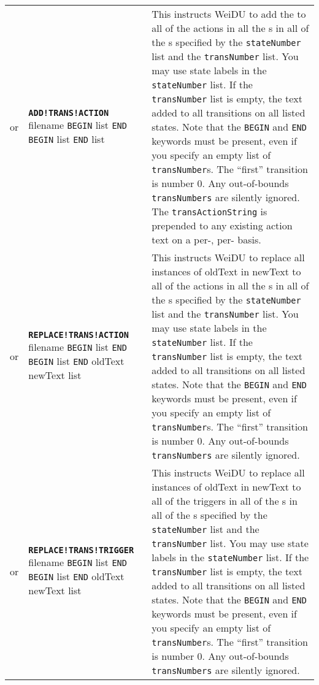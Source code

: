 \documentclass{article}
\def\ttref#1{\ahrefloc{#1}{\tt #1}}
\def\DEFINE#1{{\tt \bf #1}\label{#1}\index{#1}}
\def\t#1{{\tt #1}}
\def\Slist{{\color{red} list }}
\begin{document}
\begin{tabular}{cp{10in}|p{10in}}
  or & \DEFINE{ADD!TRANS!ACTION} filename 
    \t{BEGIN} \ttref{stateNumber} \Slist \t{END} 
    \t{BEGIN} \ttref{transNumber} \Slist \t{END}
    \ttref{transActionString} \ttref{dActionWhen} \Slist &
  This instructs WeiDU to add the \ttref{transActionString} to all
  of the actions in all the \ttref{transition}s in all of the \ttref{state}s specified by the
  \t{stateNumber} list and the \t{transNumber} list. You may use
  state labels in the \t{stateNumber} list. If the \t{transNumber} list
  is empty, the text added to all transitions on all listed states.
  Note that the \t{BEGIN} and \t{END} keywords must be present, even if you
  specify an empty list of \t{transNumber}s.
  The ``first'' transition is number 0. Any out-of-bounds \t{transNumbers}
  are silently ignored. The \t{transActionString} is prepended to any
  existing action text on a per-\ttref{transition}, per-\ttref{state}
  basis.

  \\

  or & \DEFINE{REPLACE!TRANS!ACTION} filename
    \t{BEGIN} \ttref{stateNumber} \Slist \t{END}
    \t{BEGIN} \ttref{transNumber} \Slist \t{END}
    oldText newText \ttref{dActionWhen} \Slist &
  This instructs WeiDU to replace all instances of oldText in newText to all
  of the actions in all the \ttref{transition}s in all of the \ttref{state}s specified by the
  \t{stateNumber} list and the \t{transNumber} list. You may use
  state labels in the \t{stateNumber} list. If the \t{transNumber} list
  is empty, the text added to all transitions on all listed states.
  Note that the \t{BEGIN} and \t{END} keywords must be present, even if you
  specify an empty list of \t{transNumber}s.
  The ``first'' transition is number 0. Any out-of-bounds \t{transNumbers}
  are silently ignored.

  \\
  or & \DEFINE{REPLACE!TRANS!TRIGGER} filename
    \t{BEGIN} \ttref{stateNumber} \Slist \t{END}
    \t{BEGIN} \ttref{transNumber} \Slist \t{END}
    oldText newText \ttref{dActionWhen} \Slist &
  This instructs WeiDU to replace all instances of oldText in newText to all
  of the triggers in all of the \ttref{transition}s in all of the \ttref{state}s specified by the
  \t{stateNumber} list and the \t{transNumber} list. You may use
  state labels in the \t{stateNumber} list. If the \t{transNumber} list
  is empty, the text added to all transitions on all listed states.
  Note that the \t{BEGIN} and \t{END} keywords must be present, even if you
  specify an empty list of \t{transNumber}s.
  The ``first'' transition is number 0. Any out-of-bounds \t{transNumbers}
  are silently ignored.


\end{tabular}
\end{document}
